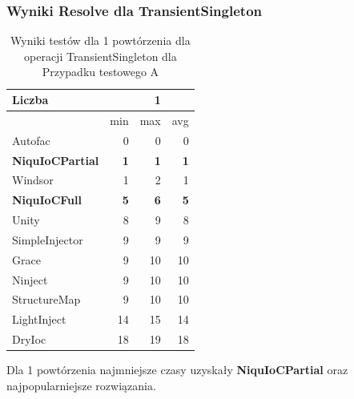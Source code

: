 \documentclass[12pt]{article}
\begin{document}
\subsubsection{Wyniki Resolve dla TransientSingleton}
\begin{table}[H]
\captionsetup{belowskip=0pt,aboveskip=0pt}
\begin{center}
\begin{small}
	\begin{tabular}{ | l | r r r | }
    		\hline
Liczba & & 1 & \\ \hline
 & min & max & avg \\ \hline
Autofac & 0 & 0 & 0 \\ \hline
\textbf{NiquIoCPartial} & \textbf{1} & \textbf{1} & \textbf{1} \\ \hline
Windsor & 1 & 2 & 1 \\ \hline
\textbf{NiquIoCFull} & \textbf{5} & \textbf{6} & \textbf{5} \\ \hline
Unity & 8 & 9 & 8 \\ \hline
SimpleInjector & 9 & 9 & 9 \\ \hline
Grace & 9 & 10 & 10 \\ \hline
Ninject & 9 & 10 & 10 \\ \hline
StructureMap & 9 & 10 & 10 \\ \hline
LightInject & 14 & 15 & 14 \\ \hline
DryIoc & 18 & 19 & 18 \\ \hline
  	\end{tabular}
\end{small}
\end{center}
\caption{Wyniki testów dla 1 powtórzenia dla operacji TransientSingleton dla Przypadku testowego A}
\label{TestCaseA_TransientSingleton1}
\end{table}
Dla 1 powtórzenia najmniejsze czasy uzyskały \textbf{NiquIoCPartial} oraz najpopularniejsze rozwiązania.
\\ \\
\end{document}
